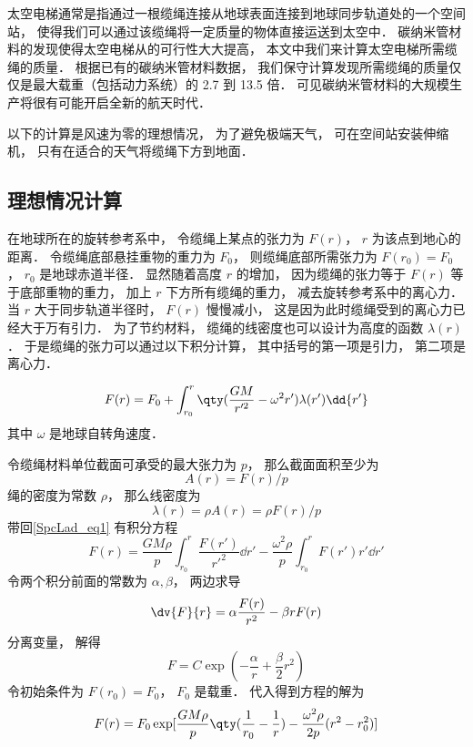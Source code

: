 

太空电梯通常是指通过一根缆绳连接从地球表面连接到地球同步轨道处的一个空间站， 使得我们可以通过该缆绳将一定质量的物体直接运送到太空中． 碳纳米管材料的发现使得太空电梯从的可行性大大提高， 本文中我们来计算太空电梯所需缆绳的质量． 根据已有的碳纳米管材料数据， 我们保守计算发现所需缆绳的质量仅仅是最大载重（包括动力系统）的 2.7 到 13.5 倍． 可见碳纳米管材料的大规模生产将很有可能开启全新的航天时代．

以下的计算是风速为零的理想情况， 为了避免极端天气， 可在空间站安装伸缩机， 只有在适合的天气将缆绳下方到地面．

\subsection{理想情况计算}
在地球所在的旋转参考系中， 令缆绳上某点的张力为 $F(r)$， $r$ 为该点到地心的距离． 令缆绳底部悬挂重物的重力为 $F_0$， 则缆绳底部所需张力为 $F(r_0) = F_0$， $r_0$ 是地球赤道半径． 显然随着高度 $r$ 的增加， 因为缆绳的张力等于 $F(r)$ 等于底部重物的重力， 加上 $r$ 下方所有缆绳的重力， 减去旋转参考系中的离心力． 当 $r$ 大于同步轨道半径时， $F(r)$ 慢慢减小， 这是因为此时缆绳受到的离心力已经大于万有引力． 为了节约材料， 缆绳的线密度也可以设计为高度的函数 $\lambda(r)$． 于是缆绳的张力可以通过以下积分计算， 其中括号的第一项是引力， 第二项是离心力．

\begin{equation}\label{SpcLad_eq1}
F(r) = F_0 + \int_{r_0}^{r} \qty(\frac{GM}{r'^2} - \omega^2 r') \lambda(r') \dd{r'}
\end{equation}
其中 $\omega$ 是地球自转角速度．

令缆绳材料单位截面可承受的最大张力为 $p$， 那么截面面积至少为
\begin{equation}
A(r) = F(r)/p
\end{equation}
绳的密度为常数 $\rho$， 那么线密度为
\begin{equation}
\lambda(r) = \rho A(r) = \rho F(r)/p
\end{equation}
带回\autoref{SpcLad_eq1} 有积分方程
\begin{equation}
F(r) = \frac{GM\rho}{p} \int_{r_0}^{r} \frac{F(r')}{r'^2} \dd{r'} - \frac{\omega^2\rho}{p}\int_{r_0}^r F(r') r' \dd{r'}
\end{equation}
令两个积分前面的常数为 $\alpha, \beta$， 两边求导
\begin{equation}
\dv{F}{r} = \alpha \frac{F(r)}{r^2} - \beta r F(r)
\end{equation}
分离变量， 解得
\begin{equation}
F = C\exp(-\frac{\alpha}{r} + \frac{\beta}{2} r^2)
\end{equation}
令初始条件为 $F(r_0) = F_0$， $F_0$ 是载重． 代入得到方程的解为
\begin{equation}
F(r) = F_0 \exp[\frac{GM\rho}{p} \qty(\frac{1}{r_0} - \frac{1}{r}) - \frac{\omega^2\rho}{2p}(r^2 - r_0^2)]
\end{equation}

